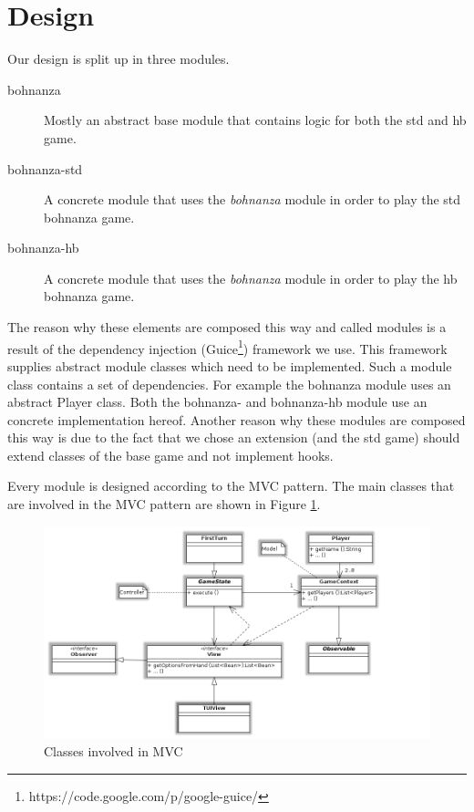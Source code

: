 \section{Design}

Our design is split up in three modules.
\begin{description}
    \item[bohnanza] {Mostly an abstract base module that contains logic for both the std and
    hb game.}
    \item[bohnanza-std] {A concrete module that uses the \emph{bohnanza} module in order to play
    the std bohnanza game.}
    \item[bohnanza-hb] {A concrete module that uses the \emph{bohnanza} module in order to play the
    hb bohnanza game.}
\end{description}
The reason why these elements are composed this way and called modules is a result of the dependency
injection (Guice\footnote{https://code.google.com/p/google-guice/}) framework we use. This framework supplies abstract module classes which
need to be implemented. Such a module class contains a set of dependencies. For example the bohnanza module uses an abstract Player class.
Both the bohnanza- and bohnanza-hb module use an concrete implementation hereof. Another reason why these modules are composed this way
is due to the fact that we chose an extension (and the std game) should extend classes of the base game and not implement hooks. 

Every module is designed according to the MVC pattern. The main classes that are involved in the MVC pattern are shown in Figure
\ref{fig:design:mvc}.

 \begin{figure}[h!]
    \includegraphics[width=\textwidth]{../img/Mvc}
    \caption{Classes involved in MVC} 
    \label{fig:design:mvc}
\end{figure}

